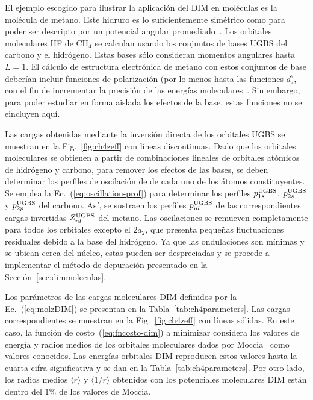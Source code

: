 El ejemplo escogido para ilustrar la aplicación del DIM en moléculas es 
la molécula de metano. Este hidruro es lo suficientemente simétrico 
como para poder ser descripto por un potencial angular 
promediado~\cite{Granados:16}. 
Los orbitales moleculares HF de CH$_4$ se calculan usando los conjuntos 
de bases UGBS del carbono y el hidrógeno. Estas bases sólo consideran 
momentos angulares hasta $L=1$. El cálculo de estructura electrónica de 
metano con estos conjuntos de base deberían incluir funciones de 
polarización (por lo menos hasta las funciones $d$), con el fin de 
incrementar la precisión de las energías moleculares~\cite{Rothenberg:71,
Hariharan:72}. Sin embargo, para poder estudiar en forma aislada los 
efectos de la base, estas funciones no se eincluyen aquí. 

Las cargas obtenidas mediante la inversión directa de los orbitales UGBS 
se muestran en la Fig.~\ref{fig:ch4zeff} con líneas discontinuas. Dado 
que los orbitales moleculares se obtienen a partir de combinaciones 
lineales de orbitales atómicos de hidrógeno y carbono, para remover los 
efectos de las bases, se deben determinar los perfiles de oscilación de 
de cada uno de los átomos constituyentes. Se emplea la 
Ec.~(\ref{eq:oscillation-prof}) para determinar los perfiles 
$p_{1s}^{\mbox{\scriptsize UGBS}}$, $p_{2s}^{\mbox{\scriptsize UGBS}}$ y 
$p_{2p}^{\mbox{\scriptsize UGBS}}$ del carbono. Así, se sustraen los 
perfiles $p_{nl}^{\mbox{\scriptsize UGBS}}$ de las correspondientes 
cargas invertidas $Z_{nl}^{\mbox{\scriptsize UGBS}}$ del metano. Las 
oscilaciones se remueven completamente para todos los orbitales excepto 
el $2a_2$, que presenta pequeñas fluctuaciones residuales debido a la 
base del hidrógeno. Ya que las ondulaciones son mínimas y se ubican 
cerca del núcleo, estas pueden ser despreciadas y se procede a 
implementar el método de depuración presentado en la 
Sección~\ref{sec:dimmoleculas}. 

Los parámetros de las cargas moleculares DIM definidos por la 
Ec.~(\ref{eq:molzDIM}) se presentan en la Tabla~\ref{tab:ch4parameters}. 
Las cargas correspondientes se muestran en la Fig.~\ref{fig:ch4zeff} con 
líneas sólidas. En este caso, la función de costo~(\ref{eq:fncosto-dim}) 
a minimizar considera los valores de energía y radios medios de los 
orbitales moleculares dados por Moccia~\cite{Moccia:69} como valores 
conocidos. Las 
energías orbitales DIM reproducen estos valores hasta la cuarta cifra 
significativa y se dan en la Tabla~\ref{tab:ch4parameters}. Por otro 
lado, los radios medios $\langle r\rangle$ y $\langle 1/r\rangle$ 
obtenidos con los potenciales moleculares DIM están dentro del $1\%$ de 
los valores de Moccia.


